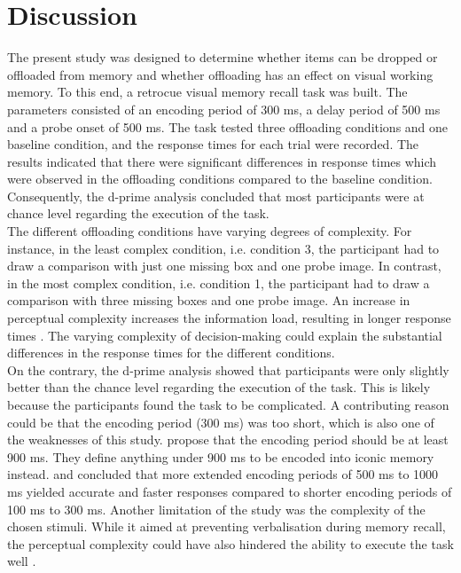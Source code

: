 \documentclass[
    a4paper,
    man,
    floatsintext,
    british
]{apa6}
\begin{document}
\section{Discussion}
The present study was designed to determine whether items can be dropped or offloaded from memory and whether offloading has an effect on visual working memory. To this end, a retrocue visual memory recall task was built. The parameters consisted of an encoding period of 300 ms, a delay period of 500 ms and a probe onset of 500 ms. The task tested three offloading conditions and one baseline condition, and the response times for each trial were recorded. The results indicated that there were significant differences in response times which were observed in the offloading conditions compared to the baseline condition. Consequently, the d-prime analysis concluded that most participants were at chance level regarding the execution of the task. 
\\
The different offloading conditions have varying degrees of complexity. For instance, in the least complex condition, i.e. condition 3, the participant had to draw a comparison with just one missing box and one probe image. In contrast, in the most complex condition, i.e. condition 1, the participant had to draw a comparison with three missing boxes and one probe image. An increase in perceptual complexity increases the information load, resulting in longer response times \parencite{eng_2005_visual, onken_1985_individual}. The varying complexity of decision-making could explain the substantial differences in the response times for the different conditions. 
\\
On the contrary, the d-prime analysis showed that participants were only slightly better than the chance level regarding the execution of the task. This is likely because the participants found the task to be complicated. A contributing reason could be that the encoding period (300 ms) was too short, which is also one of the weaknesses of this study. \textcite{janczyk_2014_orienting} propose that the encoding period should be at least 900 ms. They define anything under 900 ms to be encoded into iconic memory instead. \textcite{bays_2011_temporal} and \textcite{gao_2016_objectbased} concluded that more extended encoding periods of 500 ms to 1000 ms yielded accurate and faster responses compared to shorter encoding periods of 100 ms to 300 ms. Another limitation of the study was the complexity of the chosen stimuli. While it aimed at preventing verbalisation during memory recall, the perceptual complexity could have also hindered the ability to execute the task well \parencite{eng_2005_visual}. 
\end{document}
